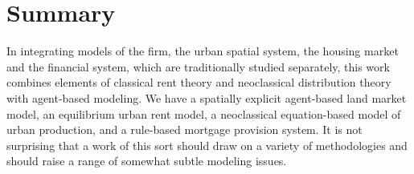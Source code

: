 









\section{Summary}\label{sec-summary}
In integrating models of the firm, the urban spatial system, the housing market and the financial system,  which are traditionally studied separately, this work combines elements of classical rent theory and neoclassical distribution theory with agent-based modeling. We have a spatially explicit agent-based land market model, an equilibrium urban rent model, a neoclassical equation-based model of urban production, and a rule-based mortgage provision system. It is not surprising that a work of this sort should draw on a variety of methodologies and should raise a range of somewhat subtle modeling issues. 

